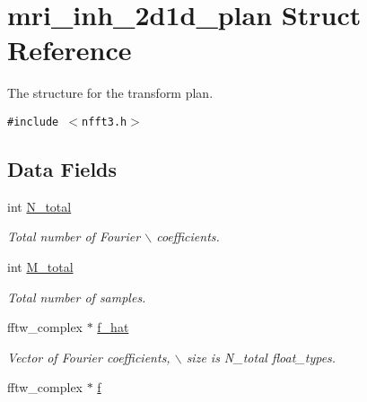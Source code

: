 \hypertarget{structmri__inh__2d1d__plan}{
\section{mri\_\-inh\_\-2d1d\_\-plan Struct Reference}
\label{structmri__inh__2d1d__plan}
}
The structure for the transform plan.  


{\tt \#include $<$nfft3.h$>$}

\subsection*{Data Fields}
\begin{CompactItemize}
\item 
\hypertarget{structmri__inh__2d1d__plan_25e2abd348fabee511856c61a7074c5b}{
int \hyperlink{structmri__inh__2d1d__plan_25e2abd348fabee511856c61a7074c5b}{N\_\-total}}
\label{structmri__inh__2d1d__plan_25e2abd348fabee511856c61a7074c5b}

\begin{CompactList}\small\item\em Total number of Fourier $\backslash$ coefficients. \item\end{CompactList}\item 
\hypertarget{structmri__inh__2d1d__plan_45f3f352231150e660ca1b8819d58d09}{
int \hyperlink{structmri__inh__2d1d__plan_45f3f352231150e660ca1b8819d58d09}{M\_\-total}}
\label{structmri__inh__2d1d__plan_45f3f352231150e660ca1b8819d58d09}

\begin{CompactList}\small\item\em Total number of samples. \item\end{CompactList}\item 
\hypertarget{structmri__inh__2d1d__plan_d34c95b6390628c8fcd223b77e37e5bf}{
fftw\_\-complex $\ast$ \hyperlink{structmri__inh__2d1d__plan_d34c95b6390628c8fcd223b77e37e5bf}{f\_\-hat}}
\label{structmri__inh__2d1d__plan_d34c95b6390628c8fcd223b77e37e5bf}

\begin{CompactList}\small\item\em Vector of Fourier coefficients, $\backslash$ size is N\_\-total float\_\-types. \item\end{CompactList}\item 
\hypertarget{structmri__inh__2d1d__plan_985f125ad6a94361939572f8323872a0}{
fftw\_\-complex $\ast$ \hyperlink{structmri__inh__2d1d__plan_985f125ad6a94361939572f8323872a0}{f}}
\label{structmri__inh__2d1d__plan_985f125ad6a94361939572f8323872a0}


\end{CompactItemize}
